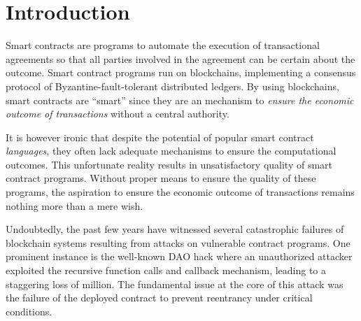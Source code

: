 \section{Introduction} \label{sec:intro}





Smart contracts are programs to automate the execution of transactional agreements so that all
parties involved in the agreement can be certain about the outcome.
Smart contract programs run on blockchains, implementing a consensus
protocol of Byzantine-fault-tolerant distributed ledgers.
By using blockchains, smart contracts are ``smart'' since they are an
mechanism to \emph{ensure the economic outcome of transactions} without a
central authority.

It is however ironic that despite the potential of popular smart contract
\emph{languages}, they often lack adequate mechanisms to ensure the
computational outcomes.  This unfortunate reality results in unsatisfactory
quality of smart contract programs. Without proper means to ensure the quality
of these programs, the aspiration to ensure the economic outcome of
transactions remains nothing more than a mere wish.

Undoubtedly, the past few years have witnessed several catastrophic failures
of blockchain systems resulting from attacks on vulnerable contract programs.
One prominent instance is the well-known DAO hack  where an unauthorized
attacker exploited the recursive function calls and callback mechanism, leading
to a staggering loss of  million. The fundamental issue at the core of this
attack was the failure of the deployed contract to prevent reentrancy under
critical conditions.

